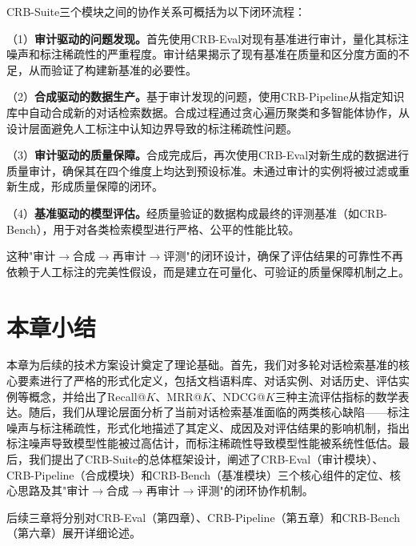 CRB-Suite三个模块之间的协作关系可概括为以下闭环流程：

（1）\textbf{审计驱动的问题发现。}首先使用CRB-Eval对现有基准进行审计，量化其标注噪声和标注稀疏性的严重程度。审计结果揭示了现有基准在质量和区分度方面的不足，从而验证了构建新基准的必要性。
    
（2）\textbf{合成驱动的数据生产。}基于审计发现的问题，使用CRB-Pipeline从指定知识库中自动合成新的对话检索数据。合成过程通过贪心遍历聚类和多智能体协作，从设计层面避免人工标注中认知边界导致的标注稀疏性问题。
    
（3）\textbf{审计驱动的质量保障。}合成完成后，再次使用CRB-Eval对新生成的数据进行质量审计，确保其在四个维度上均达到预设标准。未通过审计的实例将被过滤或重新生成，形成质量保障的闭环。
    
（4）\textbf{基准驱动的模型评估。}经质量验证的数据构成最终的评测基准（如CRB-Bench），用于对各类检索模型进行严格、公平的性能比较。


这种"审计$\rightarrow$合成$\rightarrow$再审计$\rightarrow$评测"的闭环设计，确保了评估结果的可靠性不再依赖于人工标注的完美性假设，而是建立在可量化、可验证的质量保障机制之上。


\section{本章小结}
\label{sec:chapter3_summary}

本章为后续的技术方案设计奠定了理论基础。首先，我们对多轮对话检索基准的核心要素进行了严格的形式化定义，包括文档语料库、对话实例、对话历史、评估实例等概念，并给出了Recall@$K$、MRR@$K$、NDCG@$K$三种主流评估指标的数学表达。随后，我们从理论层面分析了当前对话检索基准面临的两类核心缺陷——标注噪声与标注稀疏性，形式化地描述了其定义、成因及对评估结果的影响机制，指出标注噪声导致模型性能被过高估计，而标注稀疏性导致模型性能被系统性低估。最后，我们提出了CRB-Suite的总体框架设计，阐述了CRB-Eval（审计模块）、CRB-Pipeline（合成模块）和CRB-Bench（基准模块）三个核心组件的定位、核心思路及其"审计$\rightarrow$合成$\rightarrow$再审计$\rightarrow$评测"的闭环协作机制。

后续三章将分别对CRB-Eval（第四章）、CRB-Pipeline（第五章）和CRB-Bench（第六章）展开详细论述。






